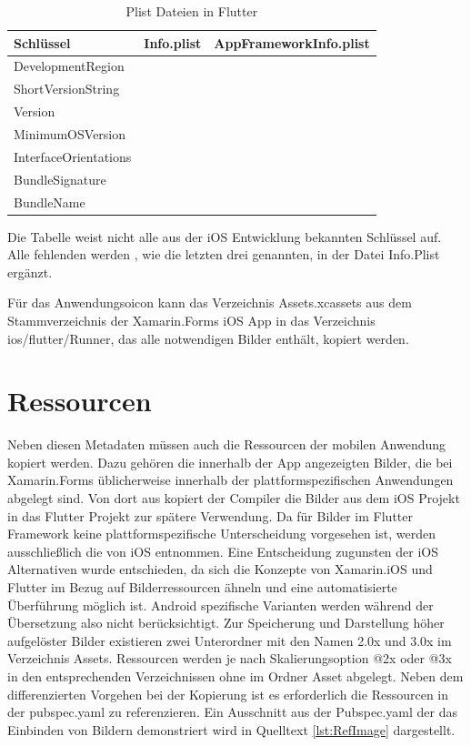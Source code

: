 \begin{table}[!ht]
  \begin{tabularx}{\linewidth}{X| X| X}
  \textbf{Schlüssel}  &  \textbf{Info.plist} & \textbf{AppFrameworkInfo.plist} \\
\hline
  DevelopmentRegion  		&  					& 		\checkmark	 \\
  ShortVersionString  		&  					& 		\checkmark	 \\
  Version  							&  					& 		\checkmark	 \\
  MinimumOSVersion  		&  					& 		\checkmark	 \\
  
  InterfaceOrientations  		& \checkmark  	&		 					\\
  BundleSignature  			&  \checkmark 	& 							\\
  BundleName  					&  \checkmark 	& 		 					\\
\end{tabularx}
\caption{Plist Dateien in Flutter }
 \label{tab:InfoPlist}
\end{table}
Die Tabelle weist nicht alle aus der iOS Entwicklung bekannten Schlüssel auf.  Alle fehlenden werden , wie die letzten drei genannten,   in der Datei Info.Plist ergänzt.

Für das Anwendungsoicon kann das Verzeichnis Assets.xcassets aus dem Stammverzeichnis der Xamarin.Forms iOS App in das Verzeichnis ios/flutter/Runner, das alle notwendigen Bilder enthält,  kopiert werden. 

\section{Ressourcen}

Neben diesen Metadaten müssen auch die Ressourcen der mobilen Anwendung kopiert werden. 
Dazu gehören die innerhalb der App angezeigten Bilder, die bei Xamarin.Forms
üblicherweise innerhalb der plattformspezifischen Anwendungen abgelegt sind.
Von dort aus kopiert der Compiler die Bilder aus dem iOS Projekt in das Flutter Projekt zur spätere Verwendung.  Da für Bilder im Flutter Framework keine plattformspezifische Unterscheidung vorgesehen ist,  werden ausschließlich die von iOS entnommen. Eine Entscheidung zugunsten der iOS Alternativen wurde  entschieden,  da sich die Konzepte von Xamarin.iOS und Flutter im Bezug auf Bilderressourcen ähneln und eine automatisierte Überführung möglich ist.  Android spezifische Varianten werden während der Übersetzung also nicht berücksichtigt.   
Zur Speicherung und Darstellung höher aufgelöster Bilder existieren zwei Unterordner mit den Namen 2.0x und 3.0x im Verzeichnis Assets.  Ressourcen werden je nach Skalierungsoption @2x oder @3x in den entsprechenden Verzeichnissen ohne im Ordner Asset abgelegt.
Neben dem differenzierten Vorgehen bei der Kopierung ist es erforderlich die Ressourcen in der pubspec.yaml zu referenzieren.  Ein Ausschnitt aus der Pubspec.yaml der das Einbinden von Bildern demonstriert wird in Quelltext  \ref{lst:RefImage} dargestellt.

